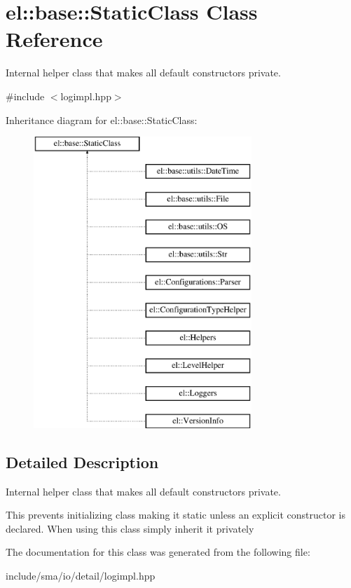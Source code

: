 \hypertarget{classel_1_1base_1_1StaticClass}{\section{el\-:\-:base\-:\-:Static\-Class Class Reference}
\label{classel_1_1base_1_1StaticClass}
}


Internal helper class that makes all default constructors private.  




{\ttfamily \#include $<$logimpl.\-hpp$>$}

Inheritance diagram for el\-:\-:base\-:\-:Static\-Class\-:\begin{figure}[H]
\begin{center}
\leavevmode
\includegraphics[height=11.000000cm]{classel_1_1base_1_1StaticClass}
\end{center}
\end{figure}


\subsection{Detailed Description}
Internal helper class that makes all default constructors private. 

This prevents initializing class making it static unless an explicit constructor is declared. When using this class simply inherit it privately 

The documentation for this class was generated from the following file\-:\begin{DoxyCompactItemize}
\item 
include/sma/io/detail/logimpl.\-hpp\end{DoxyCompactItemize}

